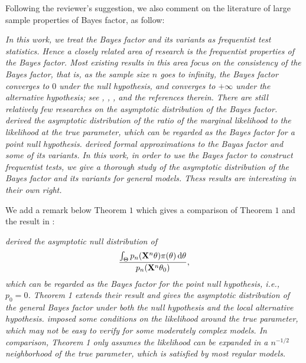 \documentclass[11pt]{article}
\theoremstyle{plain}
\theoremstyle{definition}
\theoremstyle{remark}
\begin{document}
Following the reviewer's suggestion, we also comment on the literature of large sample properties of Bayes factor, as follow:
\begin{adjustwidth}{1.5em}{1.5em}
    \emph{
        In this work, we treat the Bayes factor and its variants as frequentist test statistics.
        Hence a closely related area of research is the frequentist properties of the Bayes factor.
        Most existing results in this area focus on the consistency of the Bayes factor, that is, as the sample size $n$  goes to infinity, the Bayes factor converges to $0$ under the null hypothesis, and converges to $+\infty$ under the alternative hypothesis; see \cite{berger2003approximations}, \cite{moreno2010},      \cite{WangMin2016}, \cite{Chatterjee2017} and the references therein.
        There are still relatively few researches on the asymptotic distribution of the Bayes factor.
        \cite{clarke1990information} derived the asymptotic distribution of the ratio of the marginal likelihood to the likelihood at the true parameter, which can be regarded as the Bayes factor for a point null hypothesis.
        \cite{Gelfand1994} derived formal approximations to the Bayas factor and some of its variants.
        In this work, in order to use the Bayes factor to construct frequentist tests, we give a thorough study of the asymptotic distribution of the Bayes factor and its variants for general models.
        Thess results are interesting in their own right.
}
\end{adjustwidth}

We add a remark below Theorem $1$ which gives a comparison of Theorem $1$ and the result in \cite{clarke1990information}:
\begin{adjustwidth}{1.5em}{1.5em}
    \emph{
            \cite{clarke1990information} 
            derived the asymptotic null distribution of 
            $$
            \frac{
                    {\int_{\Theta} p_n(\mathbf{X}^{n}\theta) \pi(\theta)\, \mathrm d\theta}
            }
            {p_n(\mathbf{X}^{n}\theta_0)}
            ,
            $$
            which can be regarded as the Bayes factor for the point null hypothesis, i.e., $p_0 = 0$.
            Theorem 1 extends their result and gives the asymptotic distribution of the general Bayes factor under both the null       hypothesis and the local alternative hypothesis.
            \cite{clarke1990information} imposed some conditions on the likelihood around the true parameter, which may not be easy to verify for some    moderately complex models.
            In comparison, Theorem 1 only assumes the likelihood can be expanded in a $n^{-1/2}$ neighborhood of the true parameter,   which is satisfied by most regular models.
}
\end{adjustwidth}
\end{document}

